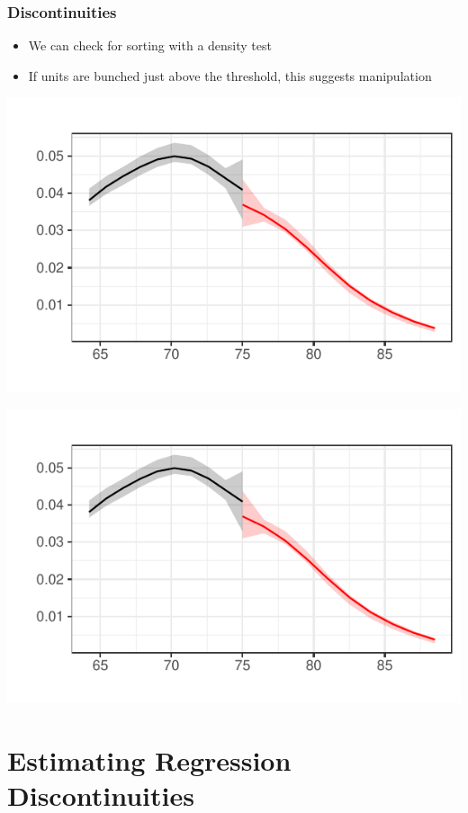 \documentclass[xcolor=x11names,compress]{beamer}\usepackage[]{graphicx}\usepackage[]{color}
\makeatletter
\def\maxwidth{ %
  \ifdim\Gin@nat@width>\linewidth
    \linewidth
  \else
    \Gin@nat@width
  \fi
}
\newenvironment{knitrout}{}{} %
\renewcommand{\(}{\begin{columns}}
\renewcommand{\)}{\end{columns}}
\newcommand{\<}[1]{\begin{column}{#1}}
\renewcommand{\>}{\end{column}}
\makeatother
\begin{document}
\begin{frame}
\frametitle{Discontinuities}
\begin{itemize}
\item We can check for sorting with a density test
\item If units are bunched just above the threshold, this suggests manipulation
\end{itemize}
\begin{knitrout}
\color{fgcolor}
\includegraphics[width=\maxwidth]{figure/Density_Fig-1} 

\includegraphics[width=\maxwidth]{figure/Density_Fig-2} 

\end{knitrout}
\end{frame}


\section{Estimating Regression Discontinuities}
\end{document}
